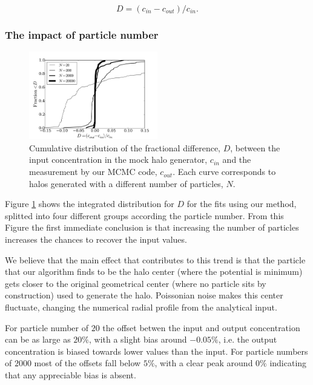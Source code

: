 \documentclass[useAMS,usenatbib]{mn2e}
\begin{document}
\begin{equation}
D=(c_{in}-c_{out})/c_{in}.  
\label{eq:D}
\end{equation}

\subsubsection{The impact of particle number}

\begin{figure}
\begin{center}
  \includegraphics[width=0.50\textwidth]{percentual_diff.pdf}
\end{center}
\caption{Cumulative distribution of the fractional difference, $D$, between
  the input concentration in the mock halo generator, $c_{in}$ and the
  measurement by our MCMC code, $c_{out}$. Each curve corresponds to
  halos generated with a different number of particles, $N$.
    \label{fig:results_mocks}}
\end{figure}

Figure \ref{fig:results_mocks} shows the integrated distribution for
$D$ for the fits using our method, splitted into four different groups
according the particle number. 
From this Figure the first immediate
conclusion is that increasing the number of particles increases the
chances to recover the input values. 

We believe that the main effect that contributes to this trend
is that the particle that our algorithm finds to be the halo center
(where the potential is minimum) gets closer to the original
geometrical center (where no particle sits by construction) used to
generate the halo.  Poissonian noise makes this center fluctuate,
changing the numerical radial profile from the analytical input. 

For particle number of $20$ the offset betwen the input and output
concentration can be as large as $20\%$, with a slight bias around
$-0.05\%$, i.e. the output concentration is biased towards lower
values than the input.
For particle numbers of $2000$ most of the offsets fall below $5\%$,
with a clear peak around $0\%$ indicating that any appreciable bias is
absent. 
\end{document}
